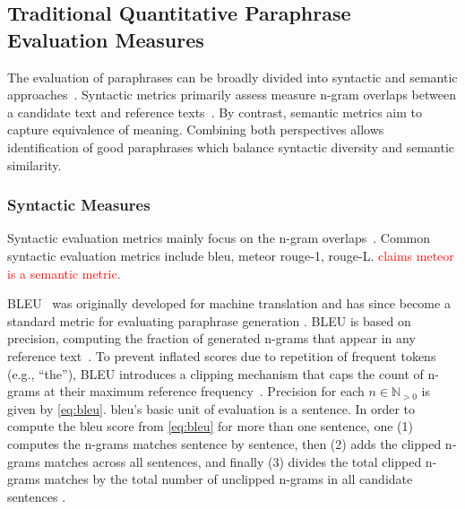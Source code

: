 \subsection{Traditional Quantitative Paraphrase Evaluation Measures}
\label{subsec:traditional_quantitative_evaluation_measures}

The evaluation of paraphrases can be broadly divided into syntactic and semantic approaches~\citep{gohsen_captions_2023}. 
Syntactic metrics primarily assess measure n-gram overlaps between a candidate text and reference texts~\citep{zhou_paraphrase_2021}. 
By contrast, semantic metrics aim to capture equivalence of meaning. 
Combining both perspectives allows identification of good paraphrases which balance syntactic diversity and semantic similarity.


\subsubsection{Syntactic Measures}
Syntactic evaluation metrics mainly focus on the n-gram overlaps~\citet{zhou_paraphrase_2021}. 
Common syntactic evaluation metrics include \ac{bleu}, \ac{meteor} \ac{rouge}-1, \ac{rouge}-L.
\textcolor{red}{\citet{kurt_pehlivanoglu_comparative_2024} claims \ac{meteor} is a semantic metric.}

BLEU~\citep{papineni_bleu_2001} was originally developed for machine translation and has since become a standard metric for evaluating paraphrase generation \citep{zhou_paraphrase_2021}. 
BLEU is based on precision, computing the fraction of generated n-grams that appear in any reference text~\citep{kurt_pehlivanoglu_comparative_2024,palivela_optimization_2021,papineni_bleu_2001}. 
To prevent inflated scores due to repetition of frequent tokens (e.g., “the”), BLEU introduces a clipping mechanism that caps the count of n-grams at their maximum reference frequency~\citep{papineni_bleu_2001}. 
Precision for each $n \in \mathbb{N}_{>0}$ is given by \autoref{eq:bleu}.
\ac{bleu}'s basic unit of evaluation is a sentence. 
In order to compute the \ac{bleu} score from \autoref{eq:bleu} for more than one sentence, 
one (1) computes the n-grams matches sentence by sentence, 
then (2) adds the clipped n-grams matches across all sentences, 
and finally (3) divides the total clipped n-grams matches by 
the total number of unclipped n-grams in all candidate sentences \citep{papineni_bleu_2001}.

